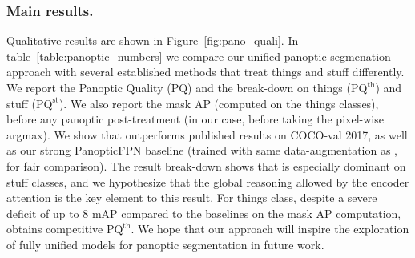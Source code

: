 \subsubsection{Main results.} Qualitative results are shown in
Figure~\ref{fig:pano_quali}. In table~\ref{table:panoptic_numbers}  we compare
our unified panoptic segmenation approach with several established methods that
treat things and stuff differently. We report the Panoptic Quality (PQ) and the
break-down on things ($\text{PQ}^\text{th}$) and stuff ($\text{PQ}^\text{st}$). We also report the mask AP (computed on the
things classes), before any panoptic post-treatment (in our case, before taking
the pixel-wise argmax).
We show that \detr outperforms published results on COCO-val 2017, as well as
our strong PanopticFPN baseline (trained with same data-augmentation 
as \detr, for fair comparison). The result break-down shows that \detr is
especially dominant on stuff classes, and we hypothesize that the global
reasoning allowed by the encoder attention is the key element to this result.
For things class, despite a severe deficit of up to 8 mAP compared to the
baselines on the mask AP computation, \detr obtains competitive
$\text{PQ}^\text{th}$.
We hope that our approach will inspire the exploration of fully unified models for panoptic segmentation in future work.
